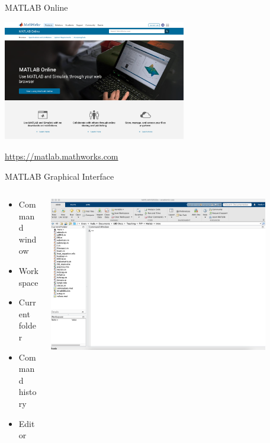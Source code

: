 \begin{frame}{MATLAB Online}
\begin{center}
	\includegraphics[width=0.6\textwidth]{matlab_online}
\end{center}
\url{https://matlab.mathworks.com}
\end{frame}



\begin{frame}{MATLAB Graphical Interface}
\begin{columns}
\begin{column}[T]{0.35\textwidth}
\begin{itemize}
	\item Command window
	\item Workspace
	\item Current folder
	\item Command history
	\item Editor
	\end{itemize}
\end{column}
\begin{column}[T]{0.75\textwidth}
	\includegraphics[width=0.85\textwidth]{initial_matlab}
\end{column}
\end{columns}

\end{frame}

